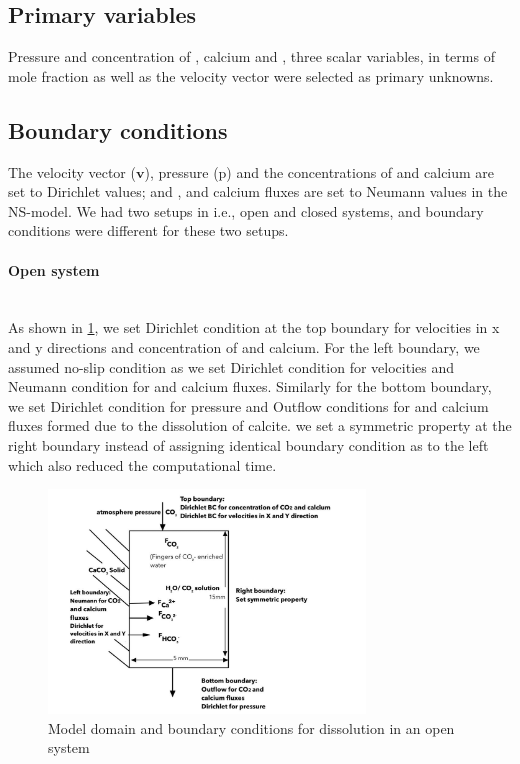 \subsection*{Primary variables} Pressure and concentration  of , calcium and , three scalar variables, in terms of mole fraction as well as the velocity vector were selected as primary unknowns. 

\subsection*{Boundary conditions} 
The velocity vector ($\mathbf{v}$), pressure (p) and the concentrations of  and calcium are set to Dirichlet values; and ,  and calcium fluxes are set to Neumann values in the NS-model. We had two setups in \DuMuX i.e., open and closed systems, and boundary conditions were different for these two setups.

\paragraph*{Open system} \mbox{} \\

As shown in \cref{fig:OpenSystem}, we set Dirichlet condition at the top boundary for velocities in x and y directions and concentration of  and calcium. For the left boundary, we assumed no-slip condition as we set Dirichlet condition for velocities and Neumann condition for  and calcium fluxes. Similarly for the bottom boundary, we set Dirichlet condition for pressure and Outflow conditions for  and calcium fluxes formed due to the dissolution of calcite. we set a symmetric property at the right boundary instead of assigning identical boundary condition as to the left which also reduced the computational time.

\begin{figure}
    \centering
    \includegraphics[width=0.75\textwidth]{PICTURES/open_system.jpg}
    \caption{Model domain and boundary conditions for  dissolution in an open system}
    \label{fig:OpenSystem}       %
\end{figure}


